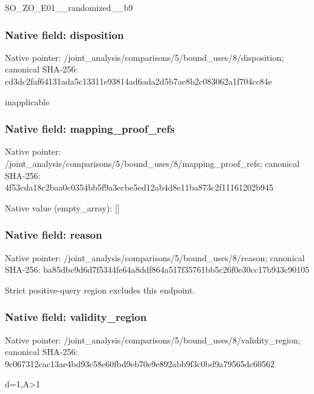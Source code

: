 \documentclass[10pt,a4paper]{article}
\begin{document}
\begingroup\raggedright\sloppy SO\_\allowbreak{}ZO\_\allowbreak{}E01\_\allowbreak{}\_\allowbreak{}randomized\_\allowbreak{}\_\allowbreak{}b9\par\endgroup

\subsubsection{Native field: disposition}
Native pointer: /joint\_\allowbreak{}analysis/comparisons/5/bound\_\allowbreak{}uses/8/disposition; canonical SHA-256: cd3dc2faf64131ada5c13311e93814ad6ada2d5b7ae8b2c083062a1f704cc84e

\begingroup\raggedright\sloppy inapplicable\par\endgroup

\subsubsection{Native field: mapping\_\allowbreak{}proof\_\allowbreak{}refs}
Native pointer: /joint\_\allowbreak{}analysis/comparisons/5/bound\_\allowbreak{}uses/8/mapping\_\allowbreak{}proof\_\allowbreak{}refs; canonical SHA-256: 4f53cda18c2baa0c0354bb5f9a3ecbe5ed12ab4d8e11ba873c2f11161202b945

Native value (empty\_\allowbreak{}array): []

\subsubsection{Native field: reason}
Native pointer: /joint\_\allowbreak{}analysis/comparisons/5/bound\_\allowbreak{}uses/8/reason; canonical SHA-256: ba85dbe9d6d7f5344fe64a8ddf864a517f35761bb5c26f0e30cc17b943c90105

\begingroup\raggedright\sloppy Strict positive-query region excludes this endpoint.\par\endgroup

\subsubsection{Native field: validity\_\allowbreak{}region}
Native pointer: /joint\_\allowbreak{}analysis/comparisons/5/bound\_\allowbreak{}uses/8/validity\_\allowbreak{}region; canonical SHA-256: 9c067312cac13ae4bd93c58e60fbd9eb70e9e892abb9f3c0bd9a79565dc60562

\begingroup\raggedright\sloppy d=\allowbreak{}1,\allowbreak{}A>1\par\endgroup
\end{document}
